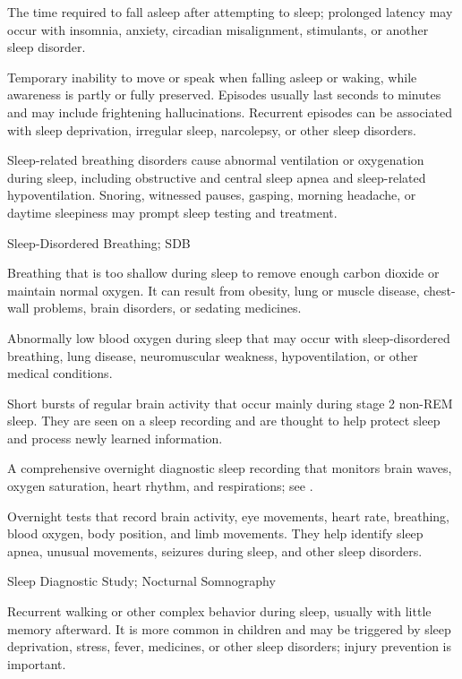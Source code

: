  The time required to fall asleep after attempting to sleep; prolonged latency may occur with insomnia, anxiety, circadian misalignment, stimulants, or another sleep disorder.

 Temporary inability to move or speak when falling asleep or waking, while awareness is partly or fully preserved.
Episodes usually last seconds to minutes and may include frightening hallucinations. Recurrent episodes
can be associated with sleep deprivation, irregular sleep, narcolepsy, or other sleep disorders.

 Sleep-related breathing disorders cause abnormal ventilation or oxygenation during sleep, including obstructive and central sleep apnea and sleep-related hypoventilation. Snoring, witnessed pauses, gasping, morning headache, or daytime sleepiness may prompt sleep testing and treatment.

\synonyms
Sleep-Disordered Breathing; SDB

 Breathing that is too shallow during sleep to remove enough carbon dioxide or maintain normal oxygen. It can result from obesity, lung or muscle disease, chest-wall problems, brain disorders, or sedating medicines.

 Abnormally low blood oxygen during sleep that may occur with sleep-disordered breathing, lung disease, neuromuscular weakness, hypoventilation, or other medical conditions.

 Short bursts of regular brain activity that occur mainly during stage 2 non-REM sleep. They are seen on a sleep recording and are thought to help protect sleep and process newly learned information.

 A comprehensive overnight diagnostic sleep recording that monitors brain waves, oxygen saturation, heart rhythm, and respirations; see .

 Overnight tests that record brain activity, eye movements, heart rate, breathing, blood oxygen, body position, and limb movements. They help identify sleep apnea, unusual movements, seizures during sleep, and other sleep disorders.

\synonyms
Sleep Diagnostic Study; Nocturnal Somnography

 Recurrent walking or other complex behavior during sleep, usually with little memory afterward. It is more common in children and may be triggered by sleep deprivation, stress, fever, medicines, or other sleep disorders; injury prevention is important.

